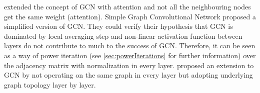 \citet{GAT} extended the concept of GCN with attention and not all the neighbouring nodes get the same weight (attention).
Simple Graph Convolutional Network \cite{simpleGCN} proposed a simplified version of GCN.
They could verify their hypothesis that GCN is dominated by local averaging step and non-linear 
activation function between layers do not contribute to much to the success of GCN. 
Therefore, it can be seen as a way of power iteration (see \ref{sec:powerIterations} for further information) over the adjacency matrix with normalization in every layer.
\citet{dynamicGCN} proposed an extension to GCN by not operating on the same graph in every layer but adopting
underlying graph topology layer by layer.

